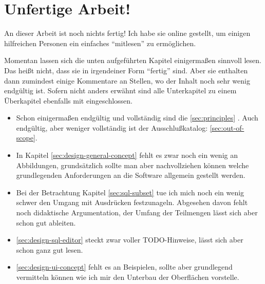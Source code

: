 \documentclass[paper=a4,fontsize=11pt,parskip=half]{scrartcl}
\title{\doctitle}
\subtitle{\docsubtitle}
\author{\docauthors}
\date{\today{}}
\begin{document}

\newpage{}

\section*{Unfertige Arbeit!}

An dieser Arbeit ist noch nichts fertig! Ich habe sie online gestellt, um einigen hilfreichen Personen ein einfaches ``mitlesen'' zu ermöglichen.

Momentan lassen sich die unten aufgeführten Kapitel einigermaßen sinnvoll lesen. Das heißt nicht, dass sie in irgendeiner Form ``fertig'' sind. Aber sie enthalten dann zumindest einige Kommentare an Stellen, wo der Inhalt noch sehr wenig endgültig ist. Sofern nicht anders erwähnt sind alle Unterkapitel zu einem Überkapitel ebenfalls mit eingeschlossen.

\begin{itemize}
  \item Schon einigermaßen endgültig und vollständig sind die \ref{sec:principles} . Auch endgültig, aber weniger vollständig ist der Ausschlußkatalog: \ref{sec:out-of-scope}. 
  \item In Kapitel \ref{sec:design-general-concept}  fehlt es zwar noch ein wenig an Abbildungen, grundsätzlich sollte man aber nachvollziehen können welche grundlegenden Anforderungen an die Software allgemein gestellt werden.
  \item Bei der Betrachtung Kapitel \ref{sec:sql-subset}  tue ich mich noch ein wenig schwer den Umgang mit Ausdrücken festzunageln. Abgesehen davon fehlt noch didaktische Argumentation, der Umfang der Teilmengen lässt sich aber schon gut ableiten.
  \item \ref{sec:design-sql-editor}  steckt zwar voller TODO-Hinweise, lässt sich aber schon ganz gut lesen.
  \item \ref{sec:design-ui-concept}  fehlt es an Beispielen, sollte aber grundlegend vermitteln können wie ich mir den Unterbau der Oberflächen vorstelle.
\end{itemize}

\tableofcontents{}
\newpage{}








\appendix{}




\listoftodos[Notes]

\printbibliography
\end{document}
